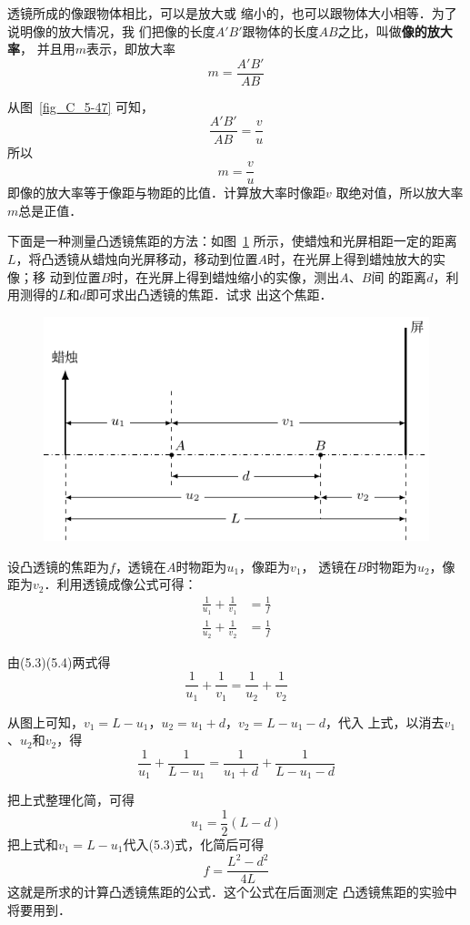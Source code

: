 透镜所成的像跟物体相比，可以是放大或
缩小的，也可以跟物体大小相等．为了说明像的放大情况，我
们把像的长度$A'B'$跟物体的长度$AB$之比，叫做\textbf{像的放大率}，
并且用$m$表示，即放大率
\[m=\frac{A'B'}{AB} \]

从图~\ref{fig_C_5-47} 可知，
\[\frac{A'B'}{AB}=\frac{v}{u} \]
所以
\[m=\frac{v}{u}\]
即像的放大率等于像距与物距的比值．计算放大率时像距$v$
取绝对值，所以放大率$m$总是正值．

\begin{example}
    下面是一种测量凸透镜焦距的方法：如图~\ref{fig_C_5-48} 
所示，使蜡烛和光屏相距一定的距离$L$，将凸透镜从蜡烛向光屏移动，移动到位置$A$时，在光屏上得到蜡烛放大的实像；移
动到位置$B$时，在光屏上得到蜡烛缩小的实像，测出$A$、$B$间
的距离$d$，利用测得的$L$和$d$即可求出凸透镜的焦距．试求
出这个焦距．
\end{example}

\begin{figure}[htbp]
    \centering
    \includegraphics{fig/C/5-48.pdf}
    \caption{}\label{fig_C_5-48}
\end{figure}

\begin{solution}
    设凸透镜的焦距为$f$，透镜在$A$时物距为$u_1$，像距为$v_1$，
    透镜在$B$时物距为$u_2$，像距为$v_2$．利用透镜成像公式可得：
   \begin{align}
\frac{1}{u_1}+\frac{1}{v_1}&=\frac{1}{f}\\
\frac{1}{u_2}+\frac{1}{v_2}&=\frac{1}{f}
   \end{align}
 
    由(5.3)(5.4)两式得
\[\frac{1}{u_1}+\frac{1}{v_1}=\frac{1}{u_2}+\frac{1}{v_2} \]
    
从图上可知，$v_1=L-u_1$，$u_2=u_1+d$，$v_2=L-u_1-d$，代入
    上式，以消去$v_1$、$u_2$和$v_2$，得
    \[\frac{1}{u_1}+\frac{1}{L-u_1}=\frac{1}{u_1+d}+\frac{1}{L-u_1-d} \]

    把上式整理化简，可得
\[u_1=\frac{1}{2}(L-d) \]
    把上式和$v_1=L-u_1$代入(5.3)式，化简后可得
\[f=\frac{L^2-d^2}{4L} \]
    这就是所求的计算凸透镜焦距的公式．这个公式在后面测定
    凸透镜焦距的实验中将要用到．
\end{solution}

